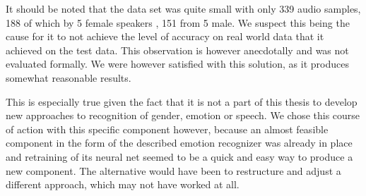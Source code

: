 It should be noted that the data set was quite small with only 339 audio samples, 188 of which by 5 female speakers , 151 from 5 male.
We suspect this being the cause for it to not achieve the level of accuracy on real world data that it achieved on the test data.
This observation is however anecdotally and was not evaluated formally.
We were however satisfied with this solution, as it produces somewhat reasonable results.

This is especially true given the fact that it is not a part of this thesis to develop new approaches to recognition of gender, emotion or speech.
We chose this course of action with this specific component however, because an almost feasible component in the form of the described emotion recognizer was already in place and retraining of its neural net seemed to be a quick and easy way to produce a new component.
The alternative would have been to restructure and adjust a different approach, which may not have worked at all.







